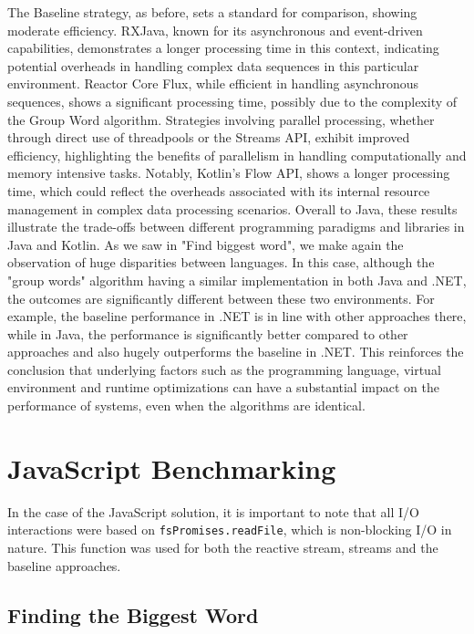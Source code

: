     The Baseline strategy, as before, sets a standard for comparison, showing moderate efficiency. RXJava, known for its asynchronous and event-driven capabilities, demonstrates a longer processing time in this context, indicating potential overheads in handling complex data sequences in this particular environment. Reactor Core Flux, while efficient in handling asynchronous sequences, shows a significant processing time, possibly due to the complexity of the Group Word algorithm. Strategies involving parallel processing, whether through direct use of threadpools or the Streams API, exhibit improved efficiency, highlighting the benefits of parallelism in handling computationally and memory intensive tasks. Notably, Kotlin's Flow API, shows a longer processing time, which could reflect the overheads associated with its internal resource management in complex data processing scenarios.
    Overall to Java, these results illustrate the trade-offs between different programming paradigms and libraries in Java and Kotlin. 
    As we saw in "Find biggest word", we make again the observation of huge disparities between languages. In this case, although the "group words" algorithm having a similar implementation in both Java and .NET, the outcomes are significantly different between these two environments. For example, the baseline performance in .NET is in line with other approaches there, while in Java, the performance is significantly better compared to other approaches and also hugely outperforms the baseline in .NET.
    This reinforces the conclusion that underlying factors such as the programming language, virtual environment and runtime optimizations can have a substantial impact on the performance of systems, even when the algorithms are identical.

\section{JavaScript Benchmarking}
\label{sec:js_implementation}

In the case of the JavaScript solution, it is important to note that all I/O interactions were based on \texttt{fsPromises.readFile}, which is non-blocking I/O in nature. This function was used for both the reactive stream, streams and the baseline approaches.

\subsection{Finding the Biggest Word}
\label{subsec:biggest_word_js}

